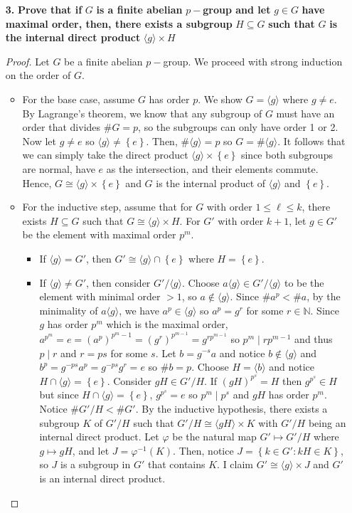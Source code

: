\documentclass[letterpaper,12pt]{article}
\newcommand{\set}[1]{\left\{ #1 \right\}}
\begin{document}
\begin{enumerate}
    \item[\textbf{3.}] \textbf{Prove that if} $G$ \textbf{is a finite abelian} $p-$\textbf{group and let} $g \in G$ \textbf{have maximal order, then, there exists a subgroup} $H \subseteq G$ \textbf{such that} $G$ \textbf{is the internal direct product} $\langle g \rangle \times H$
    \begin{proof}
       Let $G$ be a finite abelian $p-$group. We proceed with strong induction on the order of $G$. \begin{itemize}
            \item For the base case, assume $G$ has order $p$. We show $G = \langle g \rangle$ where $g \neq e$. By Lagrange's theorem, we know that any subgroup of $G$ must have an order that divides $\# G = p$, so the subgroups can only have order 1 or 2. Now let $g \neq e$ so $\langle g \rangle \neq \set{e}$. Then, $\# \langle g \rangle = p$ so $G = \# \langle g \rangle$. It follows that we can simply take the direct product $\langle g \rangle \times \set{e}$ since both subgroups are normal, have $e$ as the intersection, and their elements commute. Hence, $G \cong \langle g \rangle \times \set{e}$ and $G$ is the internal product of $\langle g \rangle$ and $\set{e}$.
            \item For the inductive step, assume that for $G$ with order $1 \leq \ell \leq k$, there exists $H \subseteq G$ such that $G \cong \langle g \rangle \times H$. For $G'$ with order $k+1$, let $g \in G'$ be the element with maximal order $p^m$. \begin{itemize}
                \item If $\langle g \rangle = G'$, then $G' \cong \langle g \rangle \cap \set{e}$ where $H=\set{e}$.
                \item If $\langle g \rangle \neq G'$, then consider $G'/\langle g \rangle$. Choose $a\langle g \rangle \in G'/\langle g \rangle$ to be the element with minimal order $> 1$, so $a \notin \langle g \rangle$. Since $\# a^p < \# a$, by the minimality of $a\langle g \rangle$, we have $a^p \in \langle g \rangle$ so $a^p = g^r$ for some $r \in \mathbb{N}$. Since $g$ has order $p^m$ which is the maximal order, $a^{p^m} = e = {(a^p)^{p^m-1}} = (g^r)^{p^{m-1}} = g^{rp^{m-1}}$ so $p^m \mid rp^{m-1}$ and thus $p \mid r$ and $r = ps$ for some $s$. Let $b = g^{-s}a$ and notice $b \notin \langle g \rangle$ and $b^p = g^{-ps}a^p = g^{-ps}g^r = e$ so $\# b = p$. Choose $H = \langle b \rangle$ and notice $H \cap \langle g \rangle = \set{e}$. Consider $gH \in G'/H$. If $(gH)^{p^s} = H$ then $g^{p^s} \in H$ but since $H \cap \langle g \rangle = \set{e}$, $g^{p^s} = e$ so $p^m \mid p^s$ and $gH$ has order $p^m$. Notice $\#G'/H < \#G'$. By the inductive hypothesis, there exists a subgroup $K$ of $G'/H$ such that $G'/H \cong \langle gH\rangle \times K$ with $G'/H$ being an internal direct product. Let $\varphi$ be the natural map $G' \mapsto G'/H$ where $g \mapsto gH$, and let $J = \varphi^{-1}(K)$. Then, notice $J = \set{k \in G' : kH \in K}$, so $J$ is a subgroup in $G'$ that contains $K$. I claim $G' \cong \langle g \rangle \times J$ and $G'$ is an internal direct product. \begin{itemize}

\end{itemize}
\end{itemize}
\end{itemize}
\end{proof}
\end{enumerate}
\end{document}
